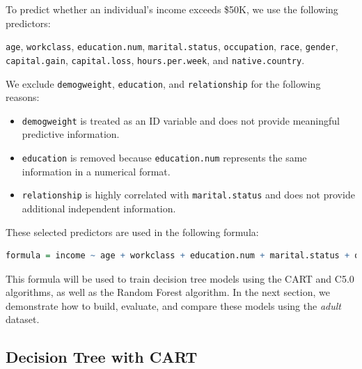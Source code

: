 \documentclass[
]{book}
\newcommand{\passthrough}[1]{#1}
\providecommand{\tightlist}{%
  \setlength{\itemsep}{0pt}\setlength{\parskip}{0pt}}
\theoremstyle{definition}
\theoremstyle{definition}
\theoremstyle{definition}
\theoremstyle{definition}
\theoremstyle{remark}
\begin{document}
To predict whether an individual's income exceeds \$50K, we use the following predictors:

\passthrough{\lstinline!age!}, \passthrough{\lstinline!workclass!}, \passthrough{\lstinline!education.num!}, \passthrough{\lstinline!marital.status!}, \passthrough{\lstinline!occupation!}, \passthrough{\lstinline!race!}, \passthrough{\lstinline!gender!}, \passthrough{\lstinline!capital.gain!}, \passthrough{\lstinline!capital.loss!}, \passthrough{\lstinline!hours.per.week!}, and \passthrough{\lstinline!native.country!}.

We exclude \passthrough{\lstinline!demogweight!}, \passthrough{\lstinline!education!}, and \passthrough{\lstinline!relationship!} for the following reasons:

\begin{itemize}
\tightlist
\item
  \passthrough{\lstinline!demogweight!} is treated as an ID variable and does not provide meaningful predictive information.\\
\item
  \passthrough{\lstinline!education!} is removed because \passthrough{\lstinline!education.num!} represents the same information in a numerical format.\\
\item
  \passthrough{\lstinline!relationship!} is highly correlated with \passthrough{\lstinline!marital.status!} and does not provide additional independent information.
\end{itemize}

These selected predictors are used in the following formula:

\begin{lstlisting}[language=R]
formula = income ~ age + workclass + education.num + marital.status + occupation + race + gender + capital.gain + capital.loss + hours.per.week + native.country
\end{lstlisting}

This formula will be used to train decision tree models using the CART and C5.0 algorithms, as well as the Random Forest algorithm. In the next section, we demonstrate how to build, evaluate, and compare these models using the \emph{adult} dataset.

\subsection*{Decision Tree with CART}\label{decision-tree-with-cart}
\end{document}
